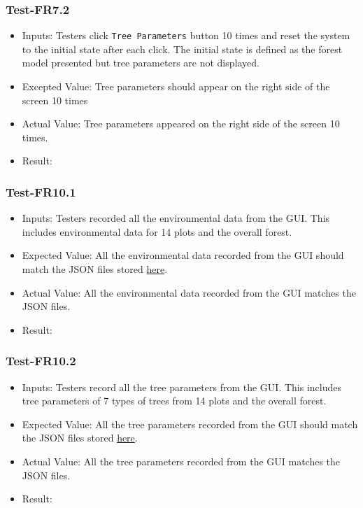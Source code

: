 \documentclass[12pt, titlepage]{article}
\begin{document}
\subsubsection{Test-FR7.2}
\begin{itemize}
\item Inputs: Testers click \verb|Tree Parameters| button
10 times and reset the system to the initial state after each click.
The initial state is defined as the forest model presented but tree 
parameters are not displayed.
\item Excepted Value: Tree parameters should appear on the right side
of the  screen 10 times
\item Actual Value: Tree parameters appeared on the right side of the
screen  10 times.
\item Result: \pass
\end{itemize}

\subsubsection{Test-FR10.1}
\begin{itemize}
\item Inputs: Testers recorded all the environmental data from
the GUI. This includes environmental data for 14 plots and the overall 
forest. 
\item Expected Value: All the environmental data recorded from the
GUI should match the JSON files stored 
\href{https://github.com/tingyushi/DTForest-DS}{here}.
\item Actual Value: All the environmental data recorded from the
GUI matches the JSON files.
\item Result: \pass
\end{itemize}

\subsubsection{Test-FR10.2}
\begin{itemize}
\item Inputs: Testers record all the tree parameters from
the GUI. This includes tree parameters of 7 types of trees from  14
plots and the overall forest. 
\item Expected Value: All the tree parameters recorded from the
GUI should match the JSON files stored 
\href{https://github.com/tingyushi/DTForest-DS}{here}.
\item Actual Value: All the tree parameters recorded from the
GUI matches the JSON files.
\item Result: \pass
\end{itemize}
\end{document}
